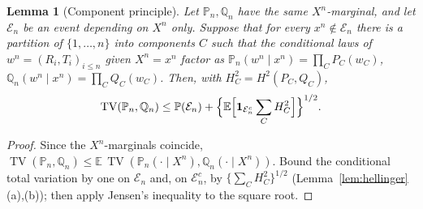 \documentclass[11pt]{article}
\newtheorem{lemma}[lemma]{Lemma}
\DeclareMathOperator{\TV}{TV}
\newcommand{\E}{\mathbb{E}}
\newcommand{\PP}{\mathbb{P}}
\newcommand{\one}{\mathbf{1}}
\begin{document}
\begin{lemma}[Component principle]\label{lem:components}
Let \(\PP_n,\mathbb Q_n\) have the same \(X^n\)-marginal, and let
\(\mathcal E_n\) be an event depending on \(X^n\) only.  Suppose that for
every \(x^n\notin\mathcal E_n\) there is a partition of \(\{1,\dots,n\}\)
into \emph{components} \(C\) such that the conditional laws of
\(w^n=(R_i,T_i)_{i\le n}\) given \(X^n=x^n\) factor as
\(\PP_n(w^n\mid x^n)=\prod_C P_C(w_C)\), \(\mathbb Q_n(w^n\mid x^n)=\prod_CQ_C(w_C)\).
Then, with \(H^2_C=H^2(P_C,Q_C)\),
\[
 \TV(\PP_n,\mathbb Q_n)\le\PP(\mathcal E_n)+\Bigl\{\E\Bigl[\one_{\mathcal E_n^c}\sum_CH^2_C\Bigr]\Bigr\}^{1/2}.
\]
\end{lemma}
\begin{proof}
Since the \(X^n\)-marginals coincide,
\(\TV(\PP_n,\mathbb Q_n)\le\E\,\TV(\PP_n(\cdot\mid X^n),\mathbb Q_n(\cdot\mid X^n))\).
Bound the conditional total variation by one on \(\mathcal E_n\) and, on
\(\mathcal E_n^c\), by \(\{\sum_CH^2_C\}^{1/2}\) (Lemma~\ref{lem:hellinger}(a),(b));
then apply Jensen's inequality to the square root.
\end{proof}
\end{document}
